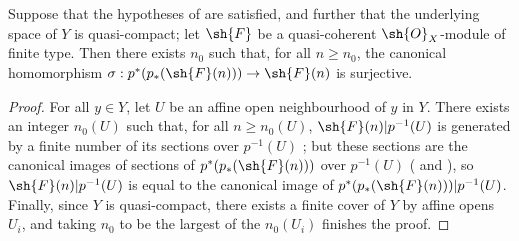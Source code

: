 \begin{corollary}[3.4.6]
\label{II.3.4.6}
Suppose that the hypotheses of  are satisfied, and further that the underlying space of $Y$ is quasi-compact;
let $\sh{F}$ be a quasi-coherent $\sh{O}_X$-module of finite type.
Then there exists $n_0$ such that, for all $n\geq n_0$, the canonical homomorphism $\sigma:p^*(p_*(\sh{F}(n)))\to\sh{F}(n)$  is surjective.
\end{corollary}

\begin{proof}
For all $y\in Y$, let $U$ be an affine open neighbourhood of $y$ in $Y$.
There exists an integer $n_0(U)$ such that, for all $n\geq n_0(U)$, $\sh{F}(n)|p^{-1}(U)$ is generated by a finite number of its sections over $p^{-1}(U)$ ;
but these sections are the canonical images of sections of $p^*(p_*(\sh{F}(n)))$ over $p^{-1}(U)$ ( and ), so $\sh{F}(n)|p^{-1}(U)$ is equal to the canonical image of $p^*(p_*(\sh{F}(n)))|p^{-1}(U)$.
Finally, since $Y$ is quasi-compact, there exists a finite cover of $Y$ by affine opens $U_i$, and taking $n_0$ to be the largest of the $n_0(U_i)$ finishes the proof.
\end{proof}

